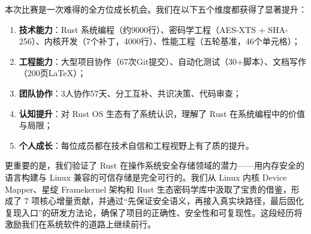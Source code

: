 本次比赛是一次难得的全方位成长机会。我们在以下五个维度都获得了显著提升：

\begin{enumerate}
    \item \textbf{技术能力}：Rust 系统编程（约9000行）、密码学工程（AES-XTS + SHA-256）、内核开发（7个补丁，4000行）、性能工程（五轮基准，46个单元格）；
    \item \textbf{工程能力}：大型项目协作（67次Git提交）、自动化测试（30+脚本）、文档写作（200页LaTeX）；
    \item \textbf{团队协作}：3人协作57天、分工互补、共识决策、代码审查；
    \item \textbf{认知提升}：对 Rust OS 生态有了系统认识，理解了 Rust 在系统编程中的价值与局限；
    \item \textbf{个人成长}：每位成员都在技术自信和工程视野上有了质的提升。
\end{enumerate}

更重要的是，我们验证了 Rust 在操作系统安全存储领域的潜力——用内存安全的语言构建与 Linux 兼容的可信存储是完全可行的。我们从 Linux 内核 Device Mapper、星绽 Framekernel 架构和 Rust 生态密码学库中汲取了宝贵的借鉴，形成了 7 项核心增量贡献，并通过“先保证安全语义，再接入真实块路径，最后固化复现入口”的研发方法论，确保了项目的正确性、安全性和可复现性。这段经历将激励我们在系统软件的道路上继续前行。